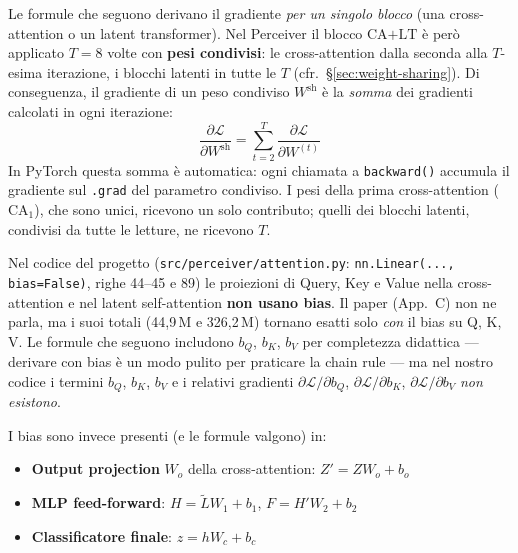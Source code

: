 \documentclass[
  11pt,
]{article}
\begin{document}
\begin{notabox}[title={\textbf{Nota sul weight sharing nel backward}}]
Le formule che seguono derivano il gradiente \emph{per un singolo blocco} (una cross-attention o un latent transformer). Nel Perceiver il blocco $\text{CA+LT}$ è però applicato $T = 8$ volte con \textbf{pesi condivisi}: le cross-attention dalla seconda alla $T$-esima iterazione, i blocchi latenti in tutte le $T$ (cfr.\ \S\ref{sec:weight-sharing}). Di conseguenza, il gradiente di un peso condiviso $W^{\text{sh}}$ è la \emph{somma} dei gradienti calcolati in ogni iterazione:
\[
\frac{\partial \mathcal{L}}{\partial W^{\text{sh}}} = \sum_{t=2}^{T} \frac{\partial \mathcal{L}}{\partial W^{(t)}}
\]
In PyTorch questa somma è automatica: ogni chiamata a \texttt{backward()} accumula il gradiente sul \texttt{.grad} del parametro condiviso. I pesi della prima cross-attention ($\text{CA}_1$), che sono unici, ricevono un solo contributo; quelli dei blocchi latenti, condivisi da tutte le letture, ne ricevono $T$.
\end{notabox}

\begin{notabox}[title={\textbf{Nota su $b_Q$, $b_K$, $b_V$: bias nelle proiezioni Q/K/V}}]
Nel codice del progetto (\texttt{src/perceiver/attention.py}: \texttt{nn.Linear(..., bias=False)}, righe 44--45 e 89) le proiezioni di Query, Key e Value nella cross-attention e nel latent self-attention \textbf{non usano bias}. Il paper (App.\ C) non ne parla, ma i suoi totali (44,9\,M e 326,2\,M) tornano esatti solo \emph{con} il bias su Q, K, V. Le formule che seguono includono $b_Q$, $b_K$, $b_V$ per completezza didattica --- derivare con bias è un modo pulito per praticare la chain rule --- ma nel nostro codice i termini $b_Q$, $b_K$, $b_V$ e i relativi gradienti $\partial \mathcal{L}/\partial b_Q$, $\partial \mathcal{L}/\partial b_K$, $\partial \mathcal{L}/\partial b_V$ \emph{non esistono}.

\medskip
I bias sono invece presenti (e le formule valgono) in:
\begin{itemize}\setlength\itemsep{0.2em}
\item \textbf{Output projection} $W_o$ della cross-attention: $Z' = Z W_o + b_o$
\item \textbf{MLP feed-forward}: $H = \tilde L W_1 + b_1$, $F = H' W_2 + b_2$
\item \textbf{Classificatore finale}: $z = h W_c + b_c$
\end{itemize}
\end{notabox}
\end{document}
